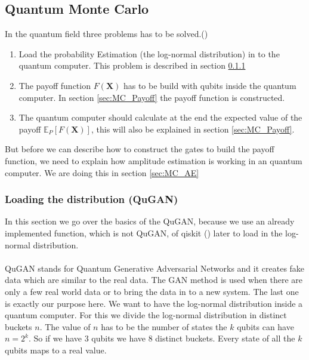 \documentclass[../../main.tex]{subfiles}
\begin{document}
\subsection{Quantum Monte Carlo}\label{sec: qmc}
In the quantum field three problems has to be solved.(\cite{1905.02666})

\begin{enumerate}
	\item Load the probability Estimation (the log-normal distribution) in to the quantum computer. This problem is described in section \ref{sec:MC_QGAN}
	\item The payoff function $F(\textbf{X})$ has to be build with qubits inside the quantum computer. In section \ref{sec:MC_Payoff} the payoff function is constructed.
	\item The quantum computer should calculate at the end the expected value of the payoff $\mathbb{E}_P[F(\textbf{X})]$, this will also be explained in section \ref{sec:MC_Payoff}.
\end{enumerate}
But before we can describe how to construct the gates to build the payoff function, we need to explain how amplitude estimation is working in an quantum computer. We are doing this in section \ref{sec:MC_AE}

\subsubsection{Loading the distribution (QuGAN)}\label{sec:MC_QGAN}
In this section we go over the basics of the QuGAN, because we use an already implemented function, which is not QuGAN, of qiskit (\cite{Qiskit}) later to load in the log-normal distribution.\\
\\
QuGAN stands for Quantum Generative Adversarial Networks and it creates fake data which are similar to the real data. The GAN method is used when there are only a few real world data or to bring the data in to a new system. The last one is exactly our purpose here. We want to have the log-normal distribution inside a quantum computer. For this we divide the log-normal distribution in distinct buckets $n$. The value of $n$ has to be the number of states the $k$ qubits can have $n=2^{k}$. So if we have 3 qubits we have 8 distinct buckets. Every state of all the $k$ qubits maps to a real value.
\end{document}
